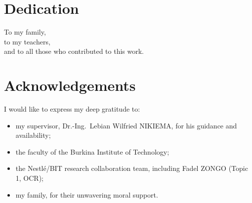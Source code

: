 \documentclass[12pt]{report}
\begin{document}
\section*{Dedication}
\setcounter{page}{2}
{}
\thispagestyle{fancy}
\vspace{2cm}
\begin{center}
To my family,\\
to my teachers,\\
and to all those who contributed to this work.
\end{center}
\newpage
{}
\section*{Acknowledgements}
{}
I would like to express my deep gratitude to:
\begin{itemize}
    \item my supervisor, Dr.-Ing.\ Lebian Wilfried NIKIEMA, for his guidance and availability;
    \item the faculty of the Burkina Institute of Technology;
    \item the Nestl\'e/BIT research collaboration team, including Fadel ZONGO (Topic 1, OCR);
    \item my family, for their unwavering moral support.
\end{itemize}
\thispagestyle{fancy}
\newpage
{}
\end{document}

